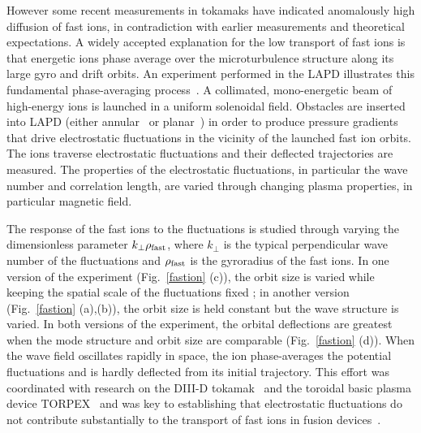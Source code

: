\documentclass[11pt]{article}
\renewcommand{\cite}{\citep}
\begin{document}
However some recent measurements in tokamaks
have indicated anomalously high diffusion of fast ions, in
contradiction with earlier measurements and theoretical expectations.
A widely accepted explanation for the low transport of fast ions is that
energetic ions phase average over the microturbulence structure
along its large gyro and drift orbits.  An experiment performed in the
LAPD illustrates this fundamental
phase-averaging process~\cite{zhou:2010,zhou:2012a, zhou:2012b, heidbrink:2012}. A collimated, mono-energetic beam
of high-energy ions is launched in a uniform solenoidal field.
Obstacles are inserted into LAPD (either annular~\cite{zhou:2012a} or
planar~\cite{carter:2006}) in order to produce pressure gradients that drive
electrostatic fluctuations in the vicinity of the launched fast ion
orbits.  The ions traverse electrostatic fluctuations and their
deflected trajectories are measured.  The properties of the
electrostatic fluctuations, in particular the wave number and
correlation length, are varied through changing plasma properties, in
particular magnetic field.  


The response of the fast ions to the fluctuations is studied through
varying the dimensionless parameter $k_\perp \rho_{\rm fast}$, where
$k_\perp$ is the typical perpendicular wave number of the fluctuations
and $\rho_{\rm fast}$ is the gyroradius of the fast ions.  
In one version of the experiment (Fig.~\ref{fastion} (c)), the orbit size is varied
while keeping the spatial scale of the fluctuations fixed ; in another version (Fig.~\ref{fastion} (a),(b)), the
orbit size is held constant but the wave structure is varied.  In both
versions of the experiment, the orbital deflections are greatest when
the mode structure and orbit size are comparable (Fig.~\ref{fastion} (d)).  When
the wave field oscillates rapidly in space, the ion phase-averages the potential
fluctuations and is hardly deflected from its initial trajectory.
This effort was coordinated with research on the DIII-D tokamak~\cite{pace:2013} and
the toroidal basic plasma device TORPEX~\cite{heidbrink:2012,bovet:2012} and was key to establishing
that electrostatic fluctuations do not contribute substantially to the
transport of fast ions in fusion devices~\cite{pace:2013}.
\end{document}
